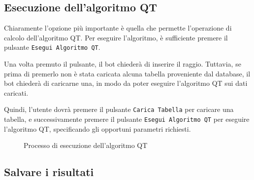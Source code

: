 \subsection{Esecuzione dell'algoritmo QT}

Chiaramente l'opzione più importante è quella che permette l'operazione di calcolo dell'algoritmo QT. Per eseguire l'algoritmo, è sufficiente premere il pulsante \texttt{Esegui Algoritmo QT}. 


Una volta premuto il pulsante, il bot chiederà di inserire il raggio. Tuttavia, se prima di premerlo non è stata caricata alcuna tabella proveniente dal database, il bot chiederà di caricarne una, in modo da poter eseguire l'algoritmo QT sui dati caricati.

Quindi, l'utente dovrà premere il pulsante \texttt{Carica Tabella} per caricare una tabella, e successivamente premere il pulsante \texttt{Esegui Algoritmo QT} per eseguire l'algoritmo QT, specificando gli opportuni parametri richiesti.

\begin{figure}[h!]
    \centering
    \hfill
    \caption{Processo di esecuzione dell'algoritmo QT}
\end{figure}

\subsection{Salvare i risultati}

